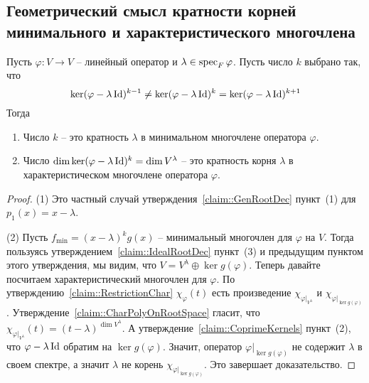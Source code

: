 \subsection{Геометрический смысл кратности корней минимального и характеристического многочлена}

\begin{claim}\label{claim::RootMultGeom}
Пусть $\varphi\colon V \to V$ -- линейный оператор и $\lambda \in \operatorname{spec}_F \varphi$. Пусть число $k$ выбрано так, что
\[
\ker (\varphi-\lambda\operatorname{Id})^{k-1} \neq \ker (\varphi-\lambda\operatorname{Id})^k = \ker (\varphi-\lambda\operatorname{Id})^{k+1}
\]
Тогда
\begin{enumerate}
\item Число $k$ -- это кратность $\lambda$ в минимальном многочлене оператора $\varphi$.

\item Число $\dim \ker(\varphi - \lambda \operatorname{Id})^k = \dim V^\lambda$ -- это кратность корня $\lambda$ в характеристическом многочлене оператора $\varphi$.
\end{enumerate}
\end{claim}
\begin{proof}
(1) Это частный случай утверждения~\ref{claim::GenRootDec} пункт~(1) для $p_1(x) = x-\lambda$.

(2) Пусть $f_\text{min} = (x-\lambda)^k g(x)$ -- минимальный многочлен для $\varphi$ на $V$. Тогда пользуясь утверждением~\ref{claim::IdealRootDec} пункт~(3) и предыдущим пунктом этого утверждения, мы видим, что $V = V^\lambda \oplus \ker g(\varphi)$. Теперь давайте посчитаем характеристический многочлен для $\varphi$. По утверждению~\ref{claim::RestrictionChar} $\chi_\varphi(t)$ есть произведение $\chi_{\varphi|_{V^\lambda}}$ и $\chi_{\varphi|_{\ker g(\varphi)}}$. Утверждение~\ref{claim::CharPolyOnRootSpace} гласит, что $\chi_{\varphi|_{V^\lambda}}(t) = (t - \lambda)^{\dim V^\lambda}$. А утверждение~\ref{claim::CoprimeKernels} пункт~(2), что $\varphi - \lambda\operatorname{Id}$ обратим на $\ker g(\varphi)$. Значит, оператор $\varphi|_{\ker g(\varphi)}$ не содержит $\lambda$ в своем спектре, а значит $\lambda$ не корень $\chi_{\varphi|_{\ker g(\varphi)}}$. Это завершает доказательство.
\end{proof}

